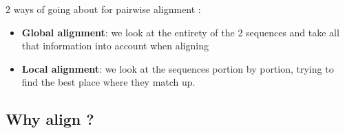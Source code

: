 \documentclass[
  11pt,
  twoside]{scrbook}
\begin{document}
2 ways of going about for pairwise alignment \autocite{sungAlgorithmsBioinformaticsPractical2011}:

\begin{itemize}
\item
  \textbf{Global alignment}: we look at the entirety of the 2 sequences and take all that information into account when aligning
\item
  \textbf{Local alignment}: we look at the sequences portion by portion, trying to find the best place where they match up.
\end{itemize}

\hypertarget{why-align}{%
\subsection{Why align ?}\label{why-align}}
\end{document}
